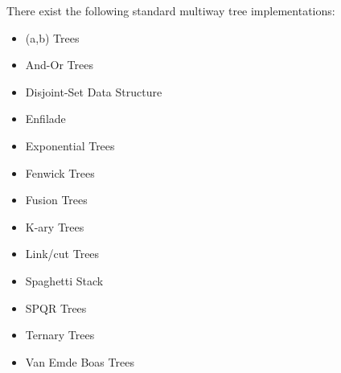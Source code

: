 \documentclass[12pt]{article}
\begin{document}
There exist the following standard multiway tree implementations:
\begin{itemize}
\item (a,b) Trees
\item And-Or Trees
\item Disjoint-Set Data Structure
\item Enfilade
\item Exponential Trees
\item Fenwick Trees
\item Fusion Trees
\item K-ary Trees
\item Link/cut Trees
\item Spaghetti Stack
\item SPQR Trees
\item Ternary Trees
\item Van Emde Boas Trees
\end{itemize}
\end{document}
